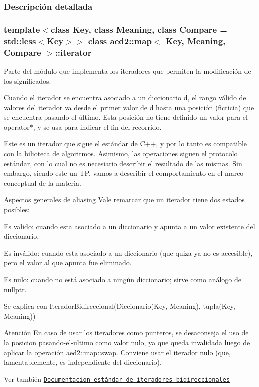 \subsubsection{Descripción detallada}
\subsubsection*{template$<$class Key, class Meaning, class Compare = std\+::less$<$\+Key$>$$>$\newline
class aed2\+::map$<$ Key, Meaning, Compare $>$\+::iterator}

Parte del módulo que implementa los iteradores que permiten la modificación de los significados. 

Cuando el iterador se encuentra asociado a un diccionario {\ttfamily d}, el rango válido de valores del iterador va desde el primer valor de {\ttfamily d} hasta una posición (ficticia) que se encuentra pasando-\/el-\/último. Esta posición no tiene definido un valor para el {\ttfamily operator$\ast$}, y se usa para indicar el fin del recorrido.

Este es un iterador que sigue el estándar de C++, y por lo tanto es compatible con la bilioteca de algoritmos. Asimismo, las operaciones siguen el protocolo estándar, con lo cual no es necesiario describir el resultado de las mismas. Sin embargo, siendo este un TP, vamos a describir el comportamiento en el marco conceptual de la materia.

\begin{DoxyParagraph}{Aspectos generales de aliasing}
Vale remarcar que un iterador tiene dos estados posibles\+:
\begin{DoxyEnumerate}
\item Es valido\+: cuando esta asociado a un diccionario y apunta a un valor existente del diccionario,
\item Es inválido\+: cuando esta asociado a un diccionario (que quiza ya no es accesible), pero el valor al que apunta fue eliminado.
\item Es nulo\+: cuando no está asociado a ningún diccionario; sirve como análogo de {\ttfamily nullptr}. 
\end{DoxyEnumerate}
\end{DoxyParagraph}


\begin{DoxyParagraph}{Se explica con}
Iterador\+Bidireccional(Diccionario(Key, Meaning), tupla(Key, Meaning))
\end{DoxyParagraph}
\begin{DoxyAttention}{Atención}
En caso de usar los iteradores como punteros, se desaconseja el uso de la posicion pasando-\/el-\/ultimo como valor nulo, ya que queda invalidada luego de aplicar la operación \hyperlink{classaed2_1_1map_a43ddb71cc91e5c6021a7a1f243d6cc4a_a43ddb71cc91e5c6021a7a1f243d6cc4a}{aed2\+::map\+::swap}. Conviene usar el iterador nulo (que, lamentablemente, es independiente del diccionario).
\end{DoxyAttention}
\begin{DoxySeeAlso}{Ver también}
\href{http://en.cppreference.com/w/cpp/concept/BidirectionalIterator}{\tt Documentacion estándar de iteradores bidireccionales} 
\end{DoxySeeAlso}


